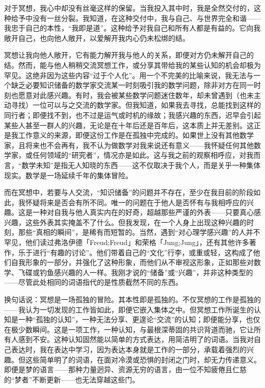 对于冥想，我心中却没有丝毫这样的保留。当我投入其中时，我是全然交付的，这种给予中没有一丝分裂。我知道，在这种交付中，我与自己、与世界完全和谐——我忠于自己的本性，“我即是道”。这种给予对我自己和所有人都是有益的。它向我敞开自己，也向他人敞开，以爱解开我内心仍未松绑的结。

冥想让我向他人敞开，它有能力解开我与他人的关系，即便对方仍未解开自己的结。然而，能与他人稍稍交流冥想工作，或分享其带给我的某些认知的机会却极为罕见。这绝非因为这些内容“过于个人化”。用一个不完美的比喻来说，我无法与一个缺乏必要知识储备的数学家交流某一时刻吸引我的数学问题，除非对方在同一时刻也愿意对此感兴趣。有时，我会被某些数学问题迷住数年，却未曾遇到（也未主动寻找）一位可以与之交流的数学家。但我知道，如果我去寻找，总能找到这样的同行者；即便找不到，也不过是运气或时机的缘故；我感兴趣的东西，迟早会引起某些人甚至一群人的兴趣，无论是在十年后还是百年后，这本质上并无差别。这正是我工作意义的来源，即便这份工作是在孤独中完成的。如果世上没有其他数学家，且将来也不会再有，我不认为做数学对我来说还有意义——我怀疑任何其他数学家，或任何领域的“研究者”，情况亦是如此。这与我之前的观察相呼应，对我而言，“数学未知”是指无人知晓的东西——这不仅取决于我个人，而是关乎一种集体现实。数学是一场延续千年的集体冒险。

而在冥想中，若要与人交流，“知识储备”的问题并不存在，至少在我目前的阶段如此，我怀疑将来是否会有所不同。唯一的问题在于他人是否怀有与我相呼应的兴趣。这是一种对自我与他人真实内在的好奇，超越那些严谨的外表——只要真心感兴趣，这些外表其实掩盖不了什么。但我发现，在一个人身上出现这种兴趣的时刻，那些“真相的瞬间”，是稀有而短暂的。当然，遇到“对心理学感兴趣”的人并不罕见，他们读过弗洛伊德「Freud;Freud」和荣格「Jung;Jung」，还有其他许多著作，乐于进行“有趣的讨论”。他们带着自己的“文化”行李，或重或轻，这构成了他们自我形象的一部分，并强化了这种形象，而他们从不审视这形象，正如那些对数学、飞碟或钓鱼感兴趣的人一样。我刚才说的“储备”或“兴趣”，并非这种类型的——尽管此处相同的词语指代的是性质截然不同的东西。

换句话说：冥想是一场孤独的冒险。其本性即是孤独的。不仅冥想的工作是孤独的——我认为一切发现的工作皆如此，即便它嵌入集体之中。但冥想工作所诞生的认知是一种“孤独的认知”，一种无法分享、更遑论“交流”的认知；即便能分享，也仅在极少数瞬间。这是一项工作，一种认知，与最根深蒂固的共识背道而驰，它让所有人感到不安。这种认知固然能以简单的方式表达，用简洁明了的词语。当我对自己表达时，我在表达中学习，因为表达本身就是工作的一部分，承载着强烈的兴趣。但这些简单明了的词语，在面对冷漠或恐惧的封闭之门时，却无力传递意义。即便是梦的语言——那种力量迥异、资源无穷的语言，由一位不知疲倦且仁慈的“梦者”不断更新——也无法穿越这些门。

